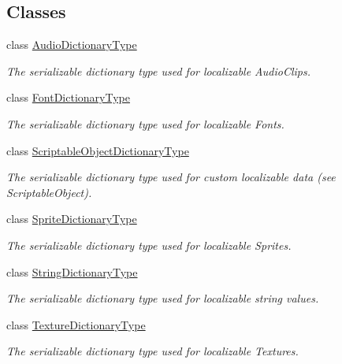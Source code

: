 \subsection*{Classes}
\begin{DoxyCompactItemize}
\item 
class \hyperlink{class_translation_asset_1_1_audio_dictionary_type}{Audio\+Dictionary\+Type}
\begin{DoxyCompactList}\small\item\em The serializable dictionary type used for localizable Audio\+Clips. \end{DoxyCompactList}\item 
class \hyperlink{class_translation_asset_1_1_font_dictionary_type}{Font\+Dictionary\+Type}
\begin{DoxyCompactList}\small\item\em The serializable dictionary type used for localizable Fonts. \end{DoxyCompactList}\item 
class \hyperlink{class_translation_asset_1_1_scriptable_object_dictionary_type}{Scriptable\+Object\+Dictionary\+Type}
\begin{DoxyCompactList}\small\item\em The serializable dictionary type used for custom localizable data (see Scriptable\+Object). \end{DoxyCompactList}\item 
class \hyperlink{class_translation_asset_1_1_sprite_dictionary_type}{Sprite\+Dictionary\+Type}
\begin{DoxyCompactList}\small\item\em The serializable dictionary type used for localizable Sprites. \end{DoxyCompactList}\item 
class \hyperlink{class_translation_asset_1_1_string_dictionary_type}{String\+Dictionary\+Type}
\begin{DoxyCompactList}\small\item\em The serializable dictionary type used for localizable string values. \end{DoxyCompactList}\item 
class \hyperlink{class_translation_asset_1_1_texture_dictionary_type}{Texture\+Dictionary\+Type}
\begin{DoxyCompactList}\small\item\em The serializable dictionary type used for localizable Textures. \end{DoxyCompactList}\end{DoxyCompactItemize}
